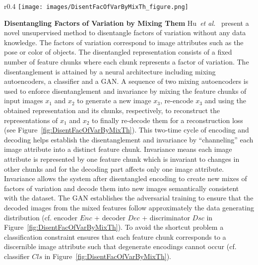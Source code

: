 \documentclass[a4paper,12pt]{report}
\begin{document}
\begin{wrapfigure}{r}{0.4\textwidth}
\texttt{[image: images/DisentFacOfVarByMixTh\_figure.png]} 
\caption{Architecture by Hu~\textit{et al.}~\cite{DisentFacOfVarByMixTh}.}
\label{fig:DisentFacOfVarByMixTh}
\end{wrapfigure}
\par \textbf{Disentangling Factors of Variation by Mixing Them} Hu~\textit{et al.}~\cite{DisentFacOfVarByMixTh} present a novel unsupervised method to disentangle factors of variation without any data knowledge. The factors of variation correspond to image attributes such as the pose or color of objects. The disentangled representation consists of a fixed number of feature chunks where each chunk represents a factor of variation. The disentanglement is attained by a neural architecture including mixing autoencoders, a classifier and a GAN. A sequence of two mixing autoencoders is used to enforce disentanglement and invariance by mixing the feature chunks of input images $x_1$ and $x_2$ to generate a new image $x_3$, re-encode $x_3$ and using the obtained representation and its chunks, respectively, to reconstruct the representations of $x_1$ and $x_2$ to finally re-decode them for a reconstruction loss (see Figure~\ref{fig:DisentFacOfVarByMixTh}). This two-time cycle of encoding and decoding helps establish the disentanglement and invariance by ``channeling'' each image attribute into a distinct feature chunk. Invariance means each image attribute is represented by one feature chunk which is invariant to changes in other chunks and for the decoding part affects only one image attribute. Invariance allows the system after disentangled encoding to create new mixes of factors of variation and decode them into new images semantically consistent with the dataset. The GAN establishes the adversarial training to ensure that the decoded images from the mixed features follow approximately the data generating distribution (cf. encoder $Enc$ + decoder $Dec$ + discriminator $Dsc$ in Figure~\ref{fig:DisentFacOfVarByMixTh}). To avoid the shortcut problem a classification constraint ensures that each feature chunk corresponds to a discernible image attribute such that degenerate encodings cannot occur (cf. classifier $Cls$ in Figure~\ref{fig:DisentFacOfVarByMixTh}).

\end{document}
